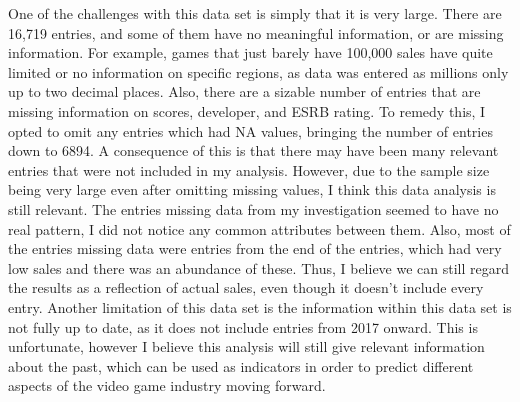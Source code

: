 \documentclass[12pt]{article}
\begin{document}
One of the challenges with this data set is simply that it is very large. There are 16,719 entries, and some of them have no meaningful 
information, or are missing information. For example, games that just barely have 100,000 sales have quite limited or no information on 
specific regions, as data was entered as millions only up to two decimal places. Also, there are a sizable number of entries that are 
missing information on scores, developer, and ESRB rating. 
To remedy this, I opted to omit any entries which had NA values, bringing the number of entries down to 6894. 
A consequence of this is that there may have been many relevant entries that were not included in my analysis.
However, due to the sample size being very large even after omitting missing values, I think this data analysis is still relevant.
The entries missing data from my investigation seemed to have no real pattern, I did not notice any common attributes between them.
Also, most of the entries missing data were entries from the end of the entries, which had very low sales and there was an abundance of these.
Thus, I believe we can still regard the results as a reflection of actual sales, even though it doesn't include every entry.
Another limitation of this data set is the information within this data set is not fully up to date, as it does not include entries from 2017 
onward. This is unfortunate, however I believe this analysis will still give relevant information about the past, which can be used as 
indicators in order to predict different aspects of the video game industry moving forward.




\end{document}
